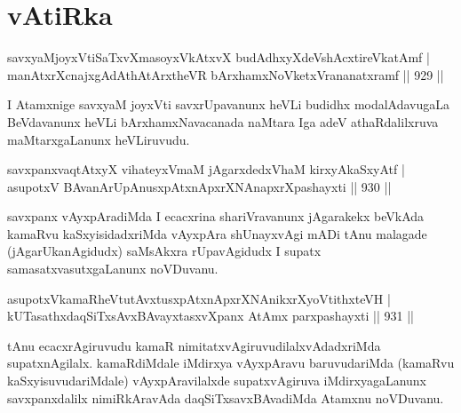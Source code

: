 \section*{vAtiRka}

\begin{shl}
savxyaMjoyxVtiSaTxvXmasoyxVkAtxvX budAdhxyXdeVshAcxtireVkatAmf | \\
manAtxrXcnajxgAdAthAtArxtheVR bArxhamxNoVketxVrananatxramf \hfill||  929 ||  
\end{shl}

\begin{artha}
I Atamxnige savxyaM joyxVti savxrUpavanunx heVLi budidhx modalAdavugaLa BeVdavanunx heVLi bArxhamxNavacanada naMtara Iga adeV athaRdalilxruva maMtarxgaLanunx heVLiruvudu.
\end{artha}


\begin{shl}
savxpanxvaqtAtxyX vihateyxVmaM jAgarxdedxVhaM kirxyAkaSxyAtf | \\
asupotxV BAvanArUpAnusxpAtxnApxrXNAnapxrXpashayxti \hfill||  930 ||  
\end{shl}

\begin{artha}
savxpanx vAyxpAradiMda I ecacxrina shariVravanunx jAgarakekx beVkAda kamaRvu kaSxyisidadxriMda vAyxpAra shUnayxvAgi mADi tAnu malagade (jAgarUkanAgidudx) saMsAkxra rUpavAgidudx I supatx samasatxvasutxgaLanunx noVDuvanu.
\end{artha}


\begin{shl}
asupotxV\s kamaRheVtutAvxtusxpAtxnApxrXNAnikxrXyoVtithxteVH | \\
kUTasathxdaqSiTxsAvxBAvayxtasxvXpanx AtAmx parxpashayxti \hfill||  931 ||  
\end{shl}

\begin{artha}
tAnu ecacxrAgiruvudu kamaR nimitatxvAgiruvudilalxvAdadxriMda supatxnAgilalx. kamaRdiMdale iMdirxya vAyxpAravu baruvudariMda (kamaRvu kaSxyisuvudariMdale) vAyxpAravilalxde supatxvAgiruva iMdirxyagaLanunx savxpanxdalilx nimiRkAravAda daqSiTxsavxBAvadiMda Atamxnu noVDuvanu.
\end{artha}


